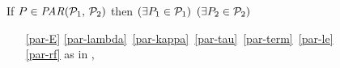 \begin{figure}
  \raggedright
  

  \noindent
  If $\aPS \in \sLPAR{\aPSS_1}{\aPSS_2}$ then  
  $(\exists P_1\in\mathcal{P}_1)$ $(\exists P_2\in\mathcal{P}_2)$
  \begin{multicols}{2}
    \begin{enumerate}[topsep=0pt,label=(\textsc{p}\arabic*),ref=\textsc{p}\arabic*]
    \item[\eqref{par-E}]
      \eqref{par-lambda}\,
      \eqref{par-kappa}\,
      \eqref{par-tau}\, 
      \eqref{par-term}\, 
      \eqref{par-le}\,
      \eqref{par-rf}
      as in ,
      \setcounter{enumi}{\value{le}}
    \item[] 

\end{enumerate}
\end{multicols}
\end{figure}
